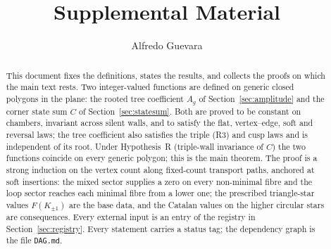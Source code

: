 \documentclass[11pt]{article}
\title{Supplemental Material}
\author{Alfredo Guevara}
\date{}
\theoremstyle{definition}
\theoremstyle{remark}
\begin{document}
\maketitle

\begin{abstract}
This document fixes the definitions, states the results, and collects the
proofs on which the main text rests. Two integer-valued functions are defined
on generic closed polygons in the plane: the rooted tree coefficient $A_g$ of
Section~\ref{sec:amplitude} and the corner state sum $C$ of
Section~\ref{sec:statesum}. Both are proved to be constant on chambers,
invariant across silent walls, and to satisfy the flat, vertex--edge, soft
and reversal laws; the tree coefficient also satisfies the triple (R3) and
cusp laws and is independent of its root. Under Hypothesis~R (triple-wall
invariance of $C$) the two functions coincide on every generic polygon; this
is the main theorem. The proof is a strong induction on the vertex count
along fixed-count transport paths, anchored at soft insertions: the mixed
sector supplies a zero on every non-minimal fibre and the loop sector reaches
each minimal fibre from a lower one; the prescribed triangle-star values
$F(K_{\pm1})$ are the base data, and the Catalan values on the higher circular
stars are consequences. Every external input is an entry of the
registry in Section~\ref{sec:registry}. Every statement carries a status tag;
the dependency graph is the file \texttt{DAG.md}.
\end{abstract}

\tableofcontents
















\end{document}

